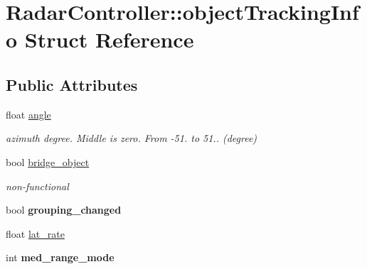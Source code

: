 \hypertarget{struct_radar_controller_1_1object_tracking_info}{}\section{Radar\+Controller\+:\+:object\+Tracking\+Info Struct Reference}
\label{struct_radar_controller_1_1object_tracking_info}
\subsection*{Public Attributes}
\begin{DoxyCompactItemize}
\item 
\hypertarget{struct_radar_controller_1_1object_tracking_info_a2aaf3920cd5901ba0f391d9b42d2b838}{}float \hyperlink{struct_radar_controller_1_1object_tracking_info_a2aaf3920cd5901ba0f391d9b42d2b838}{angle}\label{struct_radar_controller_1_1object_tracking_info_a2aaf3920cd5901ba0f391d9b42d2b838}

\begin{DoxyCompactList}\small\item\em azimuth degree. Middle is zero. From -\/51. to 51.. (degree) \end{DoxyCompactList}\item 
\hypertarget{struct_radar_controller_1_1object_tracking_info_a35f6e4d0a62549c38398b7a0ed62790e}{}bool \hyperlink{struct_radar_controller_1_1object_tracking_info_a35f6e4d0a62549c38398b7a0ed62790e}{bridge\+\_\+object}\label{struct_radar_controller_1_1object_tracking_info_a35f6e4d0a62549c38398b7a0ed62790e}

\begin{DoxyCompactList}\small\item\em non-\/functional \end{DoxyCompactList}\item 
\hypertarget{struct_radar_controller_1_1object_tracking_info_a5a0db9722daf21aee6d5ca53fb058458}{}bool {\bfseries grouping\+\_\+changed}\label{struct_radar_controller_1_1object_tracking_info_a5a0db9722daf21aee6d5ca53fb058458}

\item 
float \hyperlink{struct_radar_controller_1_1object_tracking_info_a232c799e920e93faac192726993f32cd}{lat\+\_\+rate}
\item 
\hypertarget{struct_radar_controller_1_1object_tracking_info_a3869b7891b8eb1745f48d480e9a4c259}{}int {\bfseries med\+\_\+range\+\_\+mode}\label{struct_radar_controller_1_1object_tracking_info_a3869b7891b8eb1745f48d480e9a4c259}


\end{DoxyCompactItemize}
